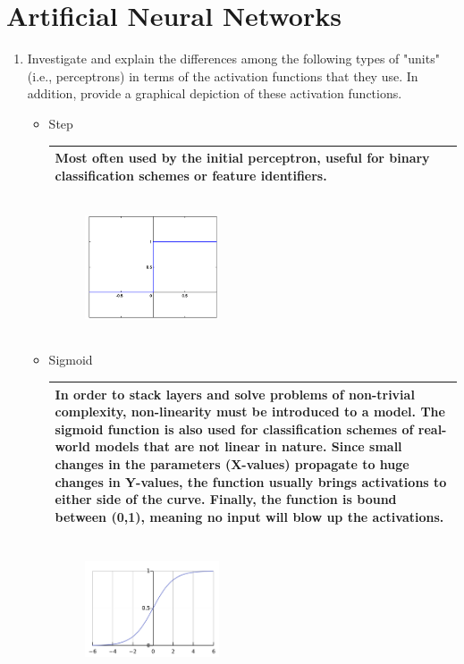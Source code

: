 \documentclass[10pt]{article}
\newenvironment{answer}
    {\begin{center}
    \begin{tabular}{|p{0.9\textwidth}|}
    \hline
    }
    { 
    \\\hline
    \end{tabular} 
    \end{center}
    }
\begin{document}
  \section*{Artificial Neural Networks}
  \begin{enumerate}[resume]
  \item Investigate and explain the differences among the following types of "units" (i.e.,
    perceptrons) in terms of the activation functions that they use. In addition, provide a
    graphical depiction of these activation functions.
    \begin{itemize}
    \item Step
      \begin{answer}
        Most often used by the initial perceptron, useful for binary classification schemes or feature identifiers.
      \end{answer}
      \begin{figure}[h!]
        \centering
        \includegraphics[width=0.4\textwidth,height=4cm]{hw3_8.png}
      \end{figure}
    \item Sigmoid
      \begin{answer}
        In order to stack layers and solve problems of non-trivial complexity, non-linearity must be introduced to a model. The sigmoid function is also used for classification schemes of real-world models that are not linear in nature. Since small changes in the parameters (X-values) propagate to huge changes in Y-values, the function usually brings activations to either side of the curve. Finally, the function is bound between (0,1), meaning no input will blow up the activations.
      \end{answer}
      \begin{figure}[h!]
        \centering
        \includegraphics[width=0.4\textwidth,height=4cm]{hw3_9.png}

\end{figure}
\end{itemize}
\end{enumerate}
\end{document}
